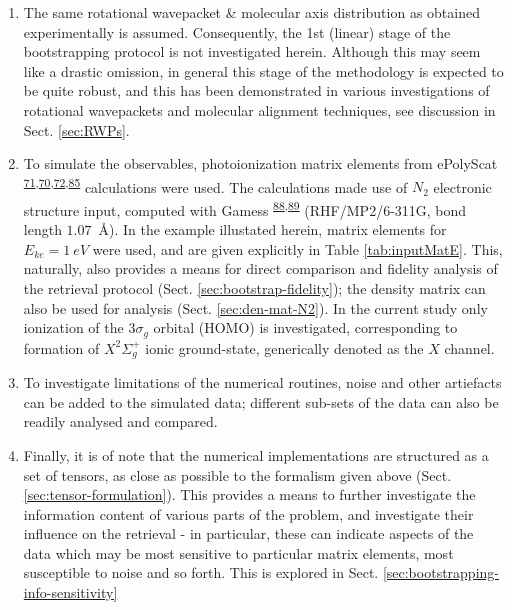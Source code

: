 \documentclass[10pt]{article}
\begin{document}
\begin{enumerate}
\item The same rotational wavepacket \& molecular axis distribution as obtained experimentally is assumed. Consequently, the 1st (linear) stage of the bootstrapping protocol is not investigated herein. Although this may seem like a drastic omission, in general this stage of the methodology is expected to be quite robust, and this has been demonstrated in various investigations of rotational wavepackets and molecular alignment techniques, see discussion in Sect. \ref{sec:RWPs}.
\item To simulate the observables, photoionization matrix elements from ePolyScat \textsuperscript{\hyperref[csl:71]{71},\hyperref[csl:70]{70},\hyperref[csl:72]{72},\hyperref[csl:85]{85}} calculations were used. The calculations made use of $N_2$ electronic structure input, computed with Gamess \textsuperscript{\hyperref[csl:88]{88},\hyperref[csl:89]{89}} (RHF/MP2/6-311G, bond length $1.07$~\AA). In the example illustated herein, matrix elements for $E_{ke}=1~eV$ were used, and are given explicitly in Table \ref{tab:inputMatE}. This, naturally, also provides a means for direct comparison and fidelity analysis of the retrieval protocol (Sect. \ref{sec:bootstrap-fidelity}); the density matrix can also be used for analysis (Sect. \ref{sec:den-mat-N2}). In the current study only ionization of the $3\sigma_g$ orbital (HOMO) is investigated, corresponding to formation of  $X^2\Sigma_{g}^{+}$ ionic ground-state, generically denoted as the $X$ channel. 
\item To investigate limitations of the numerical routines, noise and other artiefacts can be added to the simulated data; different sub-sets of the data can also be readily analysed and compared.
\item Finally, it is of note that the numerical implementations are structured as a set of tensors, as close as possible to the formalism given above (Sect. \ref{sec:tensor-formulation}). This provides a means to further investigate the information content of various parts of the problem, and investigate their influence on the retrieval - in particular, these can indicate aspects of the data which may be most sensitive to particular matrix elements, most susceptible to noise and so forth. This is explored in Sect. \ref{sec:bootstrapping-info-sensitivity}
\end{enumerate}
\end{document}
